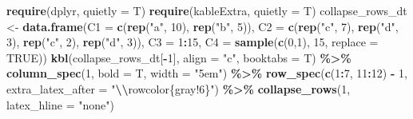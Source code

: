 \documentclass[
]{article}
\newenvironment{Shaded}{\begin{snugshade}}{\end{snugshade}}
\newcommand{\AttributeTok}[1]{\textcolor[rgb]{0.13,0.29,0.53}{#1}}
\newcommand{\ConstantTok}[1]{\textcolor[rgb]{0.56,0.35,0.01}{#1}}
\newcommand{\DecValTok}[1]{\textcolor[rgb]{0.00,0.00,0.81}{#1}}
\newcommand{\FunctionTok}[1]{\textcolor[rgb]{0.13,0.29,0.53}{\textbf{#1}}}
\newcommand{\NormalTok}[1]{#1}
\newcommand{\OtherTok}[1]{\textcolor[rgb]{0.56,0.35,0.01}{#1}}
\newcommand{\SpecialCharTok}[1]{\textcolor[rgb]{0.81,0.36,0.00}{\textbf{#1}}}
\newcommand{\StringTok}[1]{\textcolor[rgb]{0.31,0.60,0.02}{#1}}
\begin{document}
\begin{Shaded}
\begin{Highlighting}[]
\FunctionTok{require}\NormalTok{(dplyr, }\AttributeTok{quietly =}\NormalTok{ T)}
\FunctionTok{require}\NormalTok{(kableExtra, }\AttributeTok{quietly =}\NormalTok{ T)}
\NormalTok{collapse\_rows\_dt }\OtherTok{\textless{}{-}} \FunctionTok{data.frame}\NormalTok{(}\AttributeTok{C1 =} \FunctionTok{c}\NormalTok{(}\FunctionTok{rep}\NormalTok{(}\StringTok{"a"}\NormalTok{, }\DecValTok{10}\NormalTok{), }\FunctionTok{rep}\NormalTok{(}\StringTok{"b"}\NormalTok{, }\DecValTok{5}\NormalTok{)),}
\AttributeTok{C2 =} \FunctionTok{c}\NormalTok{(}\FunctionTok{rep}\NormalTok{(}\StringTok{"c"}\NormalTok{, }\DecValTok{7}\NormalTok{), }\FunctionTok{rep}\NormalTok{(}\StringTok{"d"}\NormalTok{, }\DecValTok{3}\NormalTok{), }\FunctionTok{rep}\NormalTok{(}\StringTok{"c"}\NormalTok{, }\DecValTok{2}\NormalTok{), }\FunctionTok{rep}\NormalTok{(}\StringTok{"d"}\NormalTok{, }\DecValTok{3}\NormalTok{)),}
\AttributeTok{C3 =} \DecValTok{1}\SpecialCharTok{:}\DecValTok{15}\NormalTok{,}
\AttributeTok{C4 =} \FunctionTok{sample}\NormalTok{(}\FunctionTok{c}\NormalTok{(}\DecValTok{0}\NormalTok{,}\DecValTok{1}\NormalTok{), }\DecValTok{15}\NormalTok{, }\AttributeTok{replace =} \ConstantTok{TRUE}\NormalTok{))}
\FunctionTok{kbl}\NormalTok{(collapse\_rows\_dt[}\SpecialCharTok{{-}}\DecValTok{1}\NormalTok{], }\AttributeTok{align =} \StringTok{"c"}\NormalTok{, }\AttributeTok{booktabs =}\NormalTok{ T) }\SpecialCharTok{\%\textgreater{}\%}
\FunctionTok{column\_spec}\NormalTok{(}\DecValTok{1}\NormalTok{, }\AttributeTok{bold =}\NormalTok{ T, }\AttributeTok{width =} \StringTok{"5em"}\NormalTok{) }\SpecialCharTok{\%\textgreater{}\%}
\FunctionTok{row\_spec}\NormalTok{(}\FunctionTok{c}\NormalTok{(}\DecValTok{1}\SpecialCharTok{:}\DecValTok{7}\NormalTok{, }\DecValTok{11}\SpecialCharTok{:}\DecValTok{12}\NormalTok{) }\SpecialCharTok{{-}} \DecValTok{1}\NormalTok{, }\AttributeTok{extra\_latex\_after =} \StringTok{"}\SpecialCharTok{\textbackslash{}\textbackslash{}}\StringTok{rowcolor\{gray!6\}"}\NormalTok{) }\SpecialCharTok{\%\textgreater{}\%}
\FunctionTok{collapse\_rows}\NormalTok{(}\DecValTok{1}\NormalTok{, }\AttributeTok{latex\_hline =} \StringTok{"none"}\NormalTok{)}
\end{Highlighting}
\end{Shaded}
\end{document}

